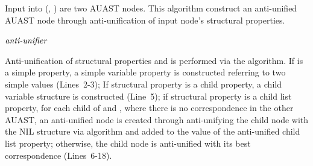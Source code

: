 \begin{algorithm}
 \caption{Input into (, ) are two AUAST nodes. This algorithm construct an anti-unified AUAST node through anti-unification of input node's structural properties.}
  \label{antiUnify}
  \begin{algorithmic}[1]
\AntiUnify
{}
	\Else
	\EndIf
\EndFor
{}
	
	\EndIf	
\EndFor
\Return $\textit{anti-unifier}$
\end{algorithmic}
\end{algorithm}

Anti-unification of structural properties  and  is performed via the  algorithm. If  is a simple property, a simple variable property is constructed referring to two simple values (Lines~2-3); If structural property is a child property, a child variable structure is constructed (Line~5); if structural property is a child list property, for each child of  and , where there is no correspondence in the other AUAST, an anti-unified node is created through anti-unifying the child node with the NIL structure via  algorithm and added to the value of the anti-unified child list property; otherwise, the child node is anti-unified with its best correspondence (Lines~6-18).


